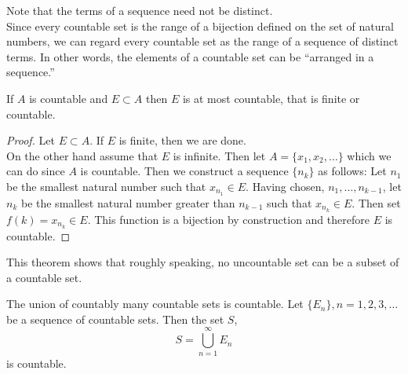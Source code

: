 Note that the terms of a sequence need not be distinct.\\


\smallskip
Since every countable set is the range of a bijection defined on the set of natural numbers, we can regard every countable set as the range of a sequence of distinct terms.  In other words, the elements of a countable set can be ``arranged in a sequence.''


\smallskip

\begin{theorem}  If $A$ is countable and $E \subset A$ then $E$ is at most countable, that is finite or countable.   \end{theorem}

\begin{proof}
Let $E \subset A$.
\indent If $E$ is finite, then we are done. \\
\indent On the other hand assume that $E$ is infinite.  Then let $A = \{x_{1}, x_{2}, \ldots\}$ which we can do since $A$ is countable.  Then we construct a sequence $\{n_{k}\}$ as follows:  Let $n_{1}$ be the smallest natural number such that $x_{n_{1}} \in E$.   Having chosen, $n_{1}, \ldots, n_{k-1}$, let $n_{k}$ be the smallest natural number greater than $n_{k-1}$ such that $x_{n_{k}} \in E$.   Then set $f(k) = x_{n_{k}} \in E$.  This function is a bijection by construction and therefore $E$ is countable.

\end{proof}

This theorem shows that roughly speaking, no uncountable set can be a subset of a countable set.

\begin{theorem}\label{thm:countable-union}  The union of countably many countable sets is countable.   Let $\{E_{n}\} ,  n=1,2,3,\ldots$ be a sequence of countable sets.  Then the set $S$,
\[S = \bigcup_{n=1}^{\infty} E_{n} \] is countable. \end{theorem}


